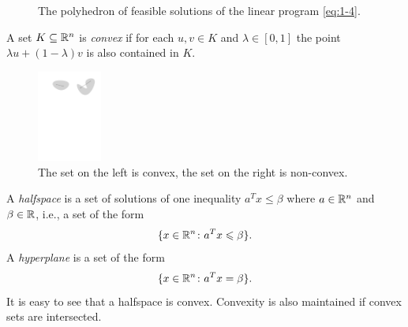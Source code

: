 \begin{example}
\begin{figure}
      \caption{The polyhedron of feasible solutions of the linear program \eqref{eq:1-4}.}
      \label{fig:1}
    \end{figure}

\end{example}








\begin{definition}
  \label{conv:def:2}
  A set $K\subseteq\mathbb{R}^n$ is \emph{convex} if for each $u,v \in K$
  and $\lambda \in [0,1]$ the point $\lambda u+(1-\lambda)v$ is also
  contained in $K$. \end{definition}
\begin{figure}[htbp]
  \centering
  \includegraphics[height=3cm]{figures/exconv.pdf} 
  \caption{The set on the left is convex, the set on the right is  non-convex.}\label{conv:fig:3}
  
\end{figure}


A \emph{halfspace} is a set of solutions of one inequality $a^Tx \leq
\beta$ where $a \in \mathbb{R}^n$ and $\beta \in \mathbb{R}$, i.e., a set of the form
\begin{displaymath}
  \{ x \in \mathbb{R}^n \colon a^Tx \leqslant \beta\}. 
\end{displaymath} 
A \emph{hyperplane} is a set of the form 
\begin{displaymath}
  \{ x \in \mathbb{R}^n \colon a^Tx = \beta\}. 
\end{displaymath} 
It is easy to see that a halfspace is convex. Convexity is also maintained if convex sets are intersected. 

